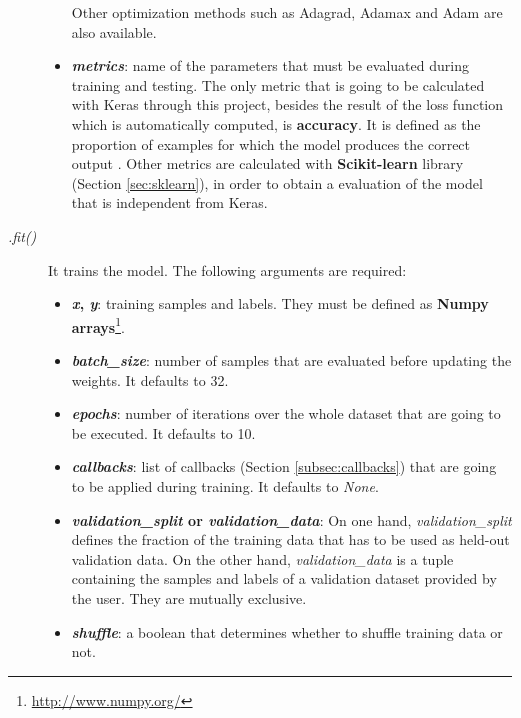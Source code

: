 \begin{description}
\begin{itemize}
		Other optimization methods such as Adagrad, Adamax and Adam are also available.
		
		\item \textbf{\textit{metrics}}: name of the parameters that must be evaluated during training and testing. The only metric that is going to be calculated with Keras through this project, besides the result of the loss function which is automatically computed, is \textbf{accuracy}. It is defined as the proportion of examples for which the model produces the correct output \cite{Goodfellow-et-al-2016}.			
		Other metrics are calculated with \textbf{Scikit-learn} library (Section \ref{sec:sklearn}), in order to obtain a evaluation of the model that is independent from Keras.
	\end{itemize}
\end{description}

\begin{description}
	\item[\textit{.fit()}] It trains the model. The following arguments are required:
	\begin{itemize}
		\item \textbf{\textit{x}, \textit{y}}: training samples and labels. They must be defined as \textbf{Numpy arrays}\footnote{\url{http://www.numpy.org/}}.
		
		\item \textbf{\textit{batch\_size}}: number of samples that are evaluated before updating the weights. It defaults to 32.
		
		\item \textbf{\textit{epochs}}: number of iterations over the whole dataset that are going to be executed. It defaults to 10.
		
		\item \textbf{\textit{callbacks}}: list of callbacks (Section \ref{subsec:callbacks}) that are going to be applied during training. It defaults to \textit{None}.
		
		\item \textbf{\textit{validation\_split} or \textit{validation\_data}}: On one hand, \textit{validation\_split} defines the fraction of the training data that has to be used as held-out validation data. On the other hand, \textit{validation\_data} is a tuple containing the samples and labels of a validation dataset provided by the user. They are mutually exclusive.
		
		\item \textbf{\textit{shuffle}}: a boolean that determines whether to shuffle training data or not. 
	\end{itemize}
\end{description}

